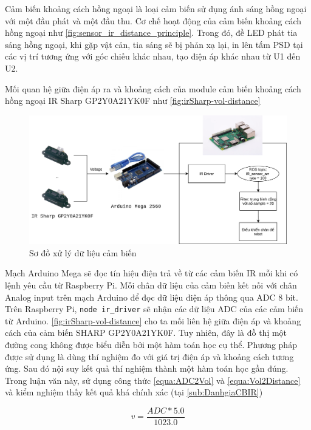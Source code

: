 Cảm biến khoảng cách hồng ngoại là loại cảm biến sử dụng ánh sáng hồng ngoại với một đầu phát và một đầu thu. Cơ chế hoạt động của cảm biến khoảng cách hồng ngoại như \figurename{ \ref{fig:sensor_ir_distance_principle}}. Trong đó, đề LED phát tia sáng hồng ngoại, khi gặp vật cản, tia sáng sẽ bị phản xạ lại, in lên tấm PSD tại các vị trí tương ứng với góc chiếu khác nhau, tạo điện áp khác nhau từ U1 đến U2.

Mối quan hệ giữa điện áp ra và khoảng cách của module cảm biến khoảng cách hồng ngoại IR Sharp GP2Y0A21YK0F như \figurename{ \ref{fig:irSharp-vol-distance}}

\begin{figure}[htbp]
    \centering
    \includegraphics[width=\linewidth]{figures/ir_safety_controller-dataProcessing.png}
    \caption{Sơ đồ xử lý dữ liệu cảm biến}
    \label{fig:workflow-dataProcessing}
\end{figure}

Mạch Arduino Mega sẽ đọc tín hiệu điện trả về từ các cảm biến IR mỗi khi có lệnh yêu cầu từ Raspberry Pi. Mỗi chân dữ liệu của cảm biến kết nối với chân Analog input trên mạch Arduino để đọc dữ liệu điện áp thông qua ADC 8 bit.
Trên Raspberry Pi, {\tt node ir\_driver} sẽ nhận các dữ liệu ADC của các cảm biến từ Arduino. \figurename{ \ref{fig:irSharp-vol-distance}} cho ta mối liên hệ giữa điện áp và khoảng cách của cảm biến SHARP GP2Y0A21YK0F. Tuy nhiên, đây là đồ thị một đường cong không được biểu diễn bởi một hàm toán học cụ thể. Phương pháp được sử dụng là dùng thí nghiệm đo với giá trị điện áp và khoảng cách tương ứng. Sau đó nội suy kết quả thí nghiệm thành một hàm toán học gần đúng. Trong luận văn này, sử dụng công thức \ref{equa:ADC2Vol} và \ref{equa:Vol2Distance} \cite{github2018} và kiểm nghiệm thấy kết quả khá chính xác (tại \ref{sub:DanhgiaCBIR})

\begin{equation}
    v = \frac{ADC * 5.0}{1023.0}
    \label{equa:ADC2Vol}
\end{equation}

